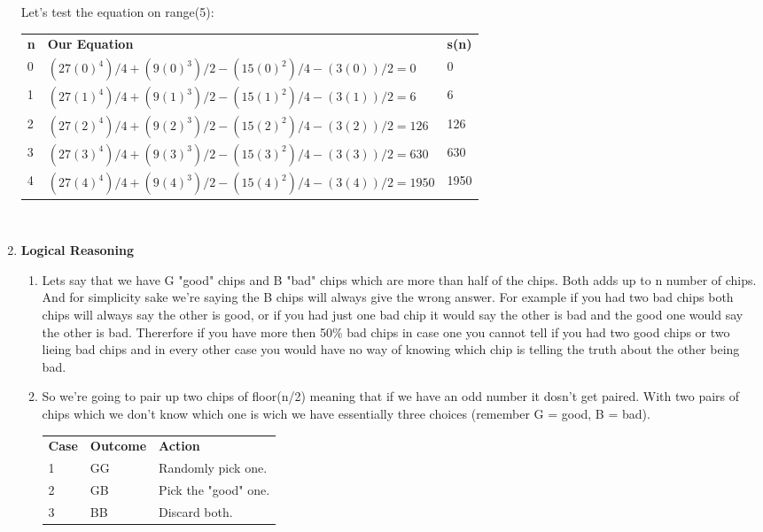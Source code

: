 \documentclass{article}
\begin{document}
\begin{enumerate}
      Let's test the equation on range(5):\\
      \begin{tabular}{lll}
        \textbf{n} & \textbf{Our Equation} & \textbf{s(n)} \\
        0 & $(27 (0)^4)/4 + (9 (0)^3)/2 - (15 (0)^2)/4 - (3 (0))/2 = 0$ & 0       \\
        1 & $(27 (1)^4)/4 + (9 (1)^3)/2 - (15 (1)^2)/4 - (3 (1))/2 = 6$ & 6       \\
        2 & $(27 (2)^4)/4 + (9 (2)^3)/2 - (15 (2)^2)/4 - (3 (2))/2 = 126$ & 126       \\
        3 & $(27 (3)^4)/4 + (9 (3)^3)/2 - (15 (3)^2)/4 - (3 (3))/2 = 630$ & 630       \\
        4 & $(27 (4)^4)/4 + (9 (4)^3)/2 - (15 (4)^2)/4 - (3 (4))/2 = 1950$ & 1950       \\
        \end{tabular} \\

        \item \textbf{Logical Reasoning} 
        \begin{enumerate}
          \item Lets say that we have G "good" chips and B "bad" chips which are more than half of the chips. Both adds up to n number of chips. 
          And for simplicity sake we're saying the B chips will always give the wrong answer. 
          For example if you had two bad chips both chips will always say the other is good, or if you had just one bad chip it would say the other is bad and the good one would say the other is bad.
          Thererfore if you have more then 50\% bad chips in case one you cannot tell if you had two good chips or two lieing bad chips and in every other case you would have no way of knowing which chip is telling the truth about the other being bad.

          \item So we're going to pair up two chips of floor(n/2) meaning that if we have an odd number it dosn't get paired. 
          With two pairs of chips which we don't know which one is wich we have essentially three choices (remember G = good, B = bad).\\
          
          \begin{tabular}{lll}
            \textbf{Case} & \textbf{Outcome} & \textbf{Action} \\
            1 & GG & Randomly pick one. \\
            2 & GB & Pick the "good" one. \\
            3 & BB & Discard both. \\
            \end{tabular} \\


\end{enumerate}
\end{enumerate}
\end{document}
